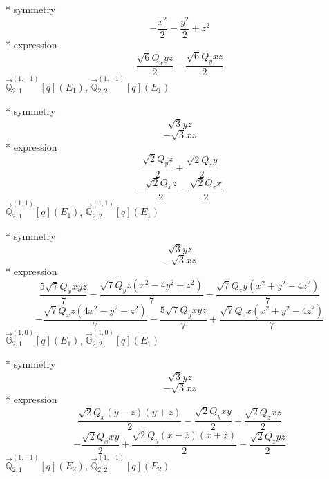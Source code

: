 \documentclass[fleqn,8pt]{jsarticle}
\begin{document}
\noindent\quad ** symmetry
\begin{dmath*}
- \frac{x^{2}}{2} - \frac{y^{2}}{2} + z^{2}
\end{dmath*}
\noindent\quad ** expression
\begin{dmath*}
\frac{\sqrt{6} Q_{x} y z}{2} - \frac{\sqrt{6} Q_{y} x z}{2}
\end{dmath*}
\noindent\quad $\vec{\mathbb{Q}}_{2,1}^{(1,-1)}[q](E_{1})$, $\vec{\mathbb{Q}}_{2,2}^{(1,-1)}[q](E_{1})$

\noindent\quad ** symmetry
\begin{dmath*}
\sqrt{3} y z
\end{dmath*}
\begin{dmath*}
- \sqrt{3} x z
\end{dmath*}
\noindent\quad ** expression
\begin{dmath*}
\frac{\sqrt{2} Q_{y} z}{2} + \frac{\sqrt{2} Q_{z} y}{2}
\end{dmath*}
\begin{dmath*}
- \frac{\sqrt{2} Q_{x} z}{2} - \frac{\sqrt{2} Q_{z} x}{2}
\end{dmath*}
\noindent\quad $\vec{\mathbb{Q}}_{2,1}^{(1,1)}[q](E_{1})$, $\vec{\mathbb{Q}}_{2,2}^{(1,1)}[q](E_{1})$

\noindent\quad ** symmetry
\begin{dmath*}
\sqrt{3} y z
\end{dmath*}
\begin{dmath*}
- \sqrt{3} x z
\end{dmath*}
\noindent\quad ** expression
\begin{dmath*}
\frac{5 \sqrt{7} Q_{x} x y z}{7} - \frac{\sqrt{7} Q_{y} z \left(x^{2} - 4 y^{2} + z^{2}\right)}{7} - \frac{\sqrt{7} Q_{z} y \left(x^{2} + y^{2} - 4 z^{2}\right)}{7}
\end{dmath*}
\begin{dmath*}
- \frac{\sqrt{7} Q_{x} z \left(4 x^{2} - y^{2} - z^{2}\right)}{7} - \frac{5 \sqrt{7} Q_{y} x y z}{7} + \frac{\sqrt{7} Q_{z} x \left(x^{2} + y^{2} - 4 z^{2}\right)}{7}
\end{dmath*}
\noindent\quad $\vec{\mathbb{G}}_{2,1}^{(1,0)}[q](E_{1})$, $\vec{\mathbb{G}}_{2,2}^{(1,0)}[q](E_{1})$

\noindent\quad ** symmetry
\begin{dmath*}
\sqrt{3} y z
\end{dmath*}
\begin{dmath*}
- \sqrt{3} x z
\end{dmath*}
\noindent\quad ** expression
\begin{dmath*}
\frac{\sqrt{2} Q_{x} \left(y - z\right) \left(y + z\right)}{2} - \frac{\sqrt{2} Q_{y} x y}{2} + \frac{\sqrt{2} Q_{z} x z}{2}
\end{dmath*}
\begin{dmath*}
- \frac{\sqrt{2} Q_{x} x y}{2} + \frac{\sqrt{2} Q_{y} \left(x - z\right) \left(x + z\right)}{2} + \frac{\sqrt{2} Q_{z} y z}{2}
\end{dmath*}
\noindent\quad $\vec{\mathbb{Q}}_{2,1}^{(1,-1)}[q](E_{2})$, $\vec{\mathbb{Q}}_{2,2}^{(1,-1)}[q](E_{2})$
\end{document}
